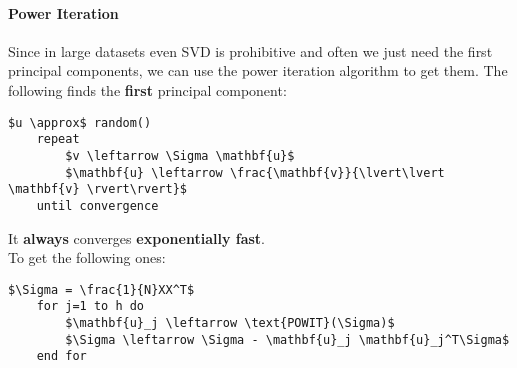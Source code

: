 \paragraph{Power Iteration} Since in large datasets even SVD is prohibitive and often we just need the first principal components, we can use the power iteration algorithm to get them. The following finds the \textbf{first} principal component:
\begin{lstlisting}[mathescape=true]
	$u \approx$ random()
	repeat
		$v \leftarrow \Sigma \mathbf{u}$
		$\mathbf{u} \leftarrow \frac{\mathbf{v}}{\lvert\lvert \mathbf{v} \rvert\rvert}$
	until convergence
\end{lstlisting}
It \textbf{always} converges \textbf{exponentially fast}.\\
To get the following ones:
\begin{lstlisting}[mathescape=true]
	$\Sigma = \frac{1}{N}XX^T$
	for j=1 to h do
		$\mathbf{u}_j \leftarrow \text{POWIT}(\Sigma)$
		$\Sigma \leftarrow \Sigma - \mathbf{u}_j \mathbf{u}_j^T\Sigma$
	end for
\end{lstlisting}